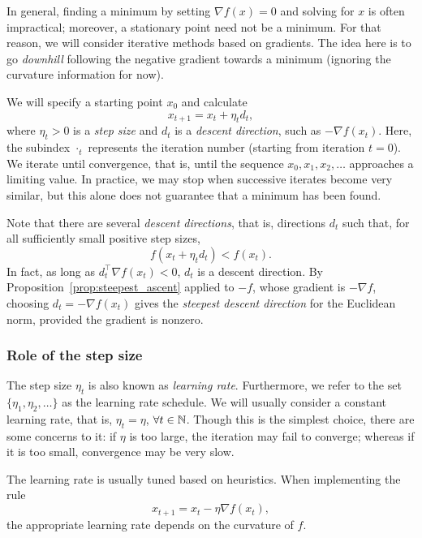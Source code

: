 In general, finding a minimum by setting $\nabla f(x) = 0$ and solving for $x$ is often impractical; moreover, a stationary point need not be a minimum. For that reason, we will consider iterative methods based on gradients. The idea here is to go \emph{downhill} following the negative gradient towards a minimum (ignoring the curvature information for now). 

We will specify a starting point $x_0$ and calculate
\begin{equation}
	x_{t+1} = x_t + \eta_t d_t,
\end{equation}
where $\eta_t>0$ is a \emph{step size} and $d_t$ is a \emph{descent direction}, such as $-\nabla f(x_t)$. Here, the subindex $\cdot_t$ represents the iteration number (starting from iteration $t=0$). We iterate until convergence, that is, until the sequence $x_0,x_1,x_2,\ldots$ approaches a limiting value. In practice, we may stop when successive iterates become very similar, but this alone does not guarantee that a minimum has been found. 

Note that there are several \emph{descent directions}, that is, directions $d_t$ such that, for all sufficiently small positive step sizes, 
\begin{equation}
	f(x_t + \eta_t d_t) < f(x_t).
\end{equation}
In fact, as long as $d_t^\top\nabla f(x_t)<0$, $d_t$ is a descent direction. By Proposition~\ref{prop:steepest_ascent} applied to $-f$, whose gradient is $-\nabla f$, choosing $d_t=-\nabla f(x_t)$ gives the \emph{steepest descent direction} for the Euclidean norm, provided the gradient is nonzero.


\subsubsection{Role of the step size}
\label{ssub:stepsize}

The step size $\eta_t$ is also known as \emph{learning rate}. Furthermore,  we refer to the set $\{\eta_1,\eta_2,\ldots\}$ as the learning rate schedule. We will usually consider a constant learning rate, that is, $\eta_t = \eta$, $\forall t\in{\mathbb N}$. Though this is the simplest choice, there are some concerns to it: if $\eta$ is too large, the iteration may fail to converge; whereas if it is too small, convergence may be very slow. 


The learning rate is usually tuned based on heuristics. When implementing the rule
\begin{equation}
    x_{t+1} = x_t - \eta \nabla f(x_t),
\end{equation}
the appropriate learning rate depends on the curvature of $f$.

